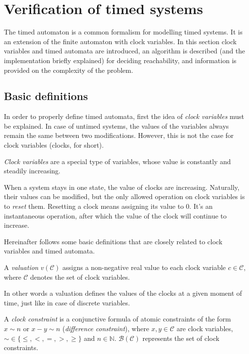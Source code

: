 \section{Verification of timed systems}

The timed automaton is a common formalism for modelling timed systems. It is an extension of the finite automaton with clock variables. In this section clock variables and timed automata are introduced, an algorithm is described (and the implementation briefly explained) for deciding reachability, and information is provided on the complexity of the problem.

\subsection{Basic definitions}


In order to properly define timed automata, first the idea of \emph{clock variables} must be explained. In case of untimed systems, the values of the variables always remain the same between two modifications. However, this is not the case for clock variables (clocks, for short).

\begin{dfn}
	\emph{Clock variables} are a special type of variables, whose value is constantly and steadily increasing.
\end{dfn}

When a system stays in one state, the value of clocks are increasing. Naturally, their values can be modified, but the only allowed operation on clock variables is to \emph{reset} them. Resetting a clock means assigning its value to 0. It's an instantaneous operation, after which the value of the clock will continue to increase.

Hereinafter follows some basic definitions that are closely related to clock variables and timed automata. 

\begin{dfn}
	A \emph{valuation} $v(\mathcal{C})$ assigns a non-negative real value
	to each clock variable $c \in \mathcal{C}$, where $\mathcal{C}$ denotes the set of clock
	variables.
\end{dfn}

In other words a valuation defines the values of the clocks at a given moment of time, just like in case of discrete variables.

\begin{dfn}
	A \emph{clock constraint} is a conjunctive formula of atomic
	constraints of the form $x \sim n$ or $x - y \sim n$ (\emph{difference
		constraint}), where $x,y \in \mathcal{C}$ are clock variables, $\sim \in \{\leq,<,=,>,\geq\}$ and \hbox{$n \in \mathbb{N}$}. $\mathcal{B}(\mathcal{C})$ represents the set of clock
	constraints.
\end{dfn}

